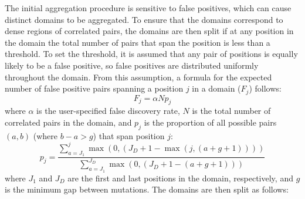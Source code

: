 \documentclass[11pt]{article}
\begin{document}
The initial aggregation procedure is sensitive to false positives, which can cause distinct domains to be aggregated.
To ensure that the domains correspond to dense regions of correlated pairs, the domains are then split if at any position in the domain the total number of pairs that span the position is less than a threshold.
To set the threshold, it is assumed that any pair of positions is equally likely to be a false positive, so false positives are distributed uniformly throughout the domain.
From this assumption, a formula for the expected number of false positive pairs spanning a position $j$ in a domain ($F_j$) follows:
$$F_j = \alpha N p_j$$
where $\alpha$ is the user-specified false discovery rate, $N$ is the total number of correlated pairs in the domain, and $p_j$ is the proportion of all possible pairs $(a, b)$ (where $b - a > g$) that span position $j$:
$$p_j = \frac{\sum_{a=J_1}^{j}{\max{(0, (J_D + 1 - \max{(j, (a + g + 1))}))}}}{\sum_{a=J_1}^{J_D}{\max{(0, (J_D + 1 - (a + g + 1)))}}}$$
where $J_1$ and $J_D$ are the first and last positions in the domain, respectively, and $g$ is the minimum gap between mutations.
The domains are then split as follows:
\end{document}
